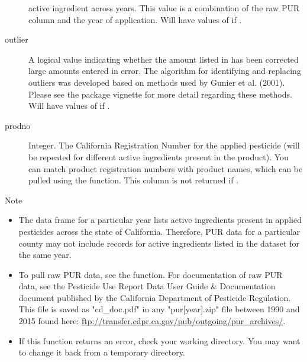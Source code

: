 \documentclass[a4paper]{book}
\begin{document}
\begin{Value}
\begin{description}
active ingredient across years. This value is a combination of the raw PUR
 column and the year of application. Will have values of
 if .
\item[outlier] A logical value indicating whether the
amount listed in  has been corrected large amounts
entered in error. The algorithm for identifying and replacing outliers
was developed based on methods used by Gunier et al. (2001). Please see
the package vignette for more detail regarding these methods. Will have
values of  if .
\item[prodno] Integer. The California Registration Number for the applied
pesticide (will be repeated for different active ingredients present in
the product). You can match product registration numbers with product
names, which can be pulled using the  function.
This column is not returned if .

\end{description}

\end{Value}
%
\begin{Section}{Note}

\begin{itemize}

\item The  data frame for a particular year lists
active ingredients present in applied pesticides across the state of
California. Therefore, PUR data for a particular county may not include
records for active ingredients listed in the  dataset
for the same year.
\item To pull raw PUR data, see the  function.
For documentation of raw PUR data, see the Pesticide Use Report Data User
Guide \& Documentation document published by the California Department of
Pesticide Regulation. This file is saved as "cd\_doc.pdf" in
any "pur[year].zip" file between 1990 and 2015 found here:
\url{ftp://transfer.cdpr.ca.gov/pub/outgoing/pur_archives/}.
\item If this function returns an error, check your working directory.
You may want to change it back from a temporary directory.

\end{itemize}

\end{Section}
%
\end{document}
